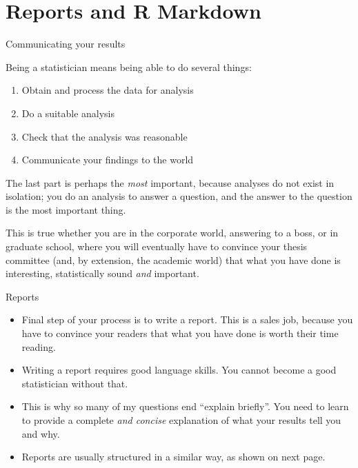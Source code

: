 \documentclass[unknownkeysallowed]{beamer}\usepackage[]{graphicx}\usepackage[]{color}
\begin{document}

\section{Reports and R Markdown}

\frame{\sectionpage}

\begin{frame}[fragile]{Communicating your results}

  Being a statistician means being able to do several things:
  
  \begin{enumerate}
  \item Obtain and process the data for analysis
  \item Do a suitable analysis
  \item Check that the analysis was reasonable
  \item Communicate your findings to the world
  \end{enumerate}
  
  The last part is perhaps the \emph{most} important, because analyses
  do not exist in isolation; you do an analysis to answer a question, 
  and the answer to the question is the most important thing.
  
  This is true whether you are in the corporate world, answering to a
  boss, or in graduate school, where you will eventually have to
  convince your thesis committee (and, by extension, the academic
  world) that what you have done is interesting, statistically sound
  \emph{and} important.
  
\end{frame}

\begin{frame}[fragile]{Reports}
  
  \begin{itemize}
  \item Final step of your process is to write a report. This is a
    sales job, because you have to convince your readers
    that what you have done is worth their time reading.
  \item Writing a report requires good language skills. You cannot
    become a good statistician without that.
  \item This is why so many of my questions end ``explain
    briefly''. You need to learn to provide a complete \emph{and
      concise} explanation of what your results tell you and why.
  \item Reports are usually structured in a similar way, as shown on
    next page.
    
  \end{itemize}
  
\end{frame}
\end{document}
